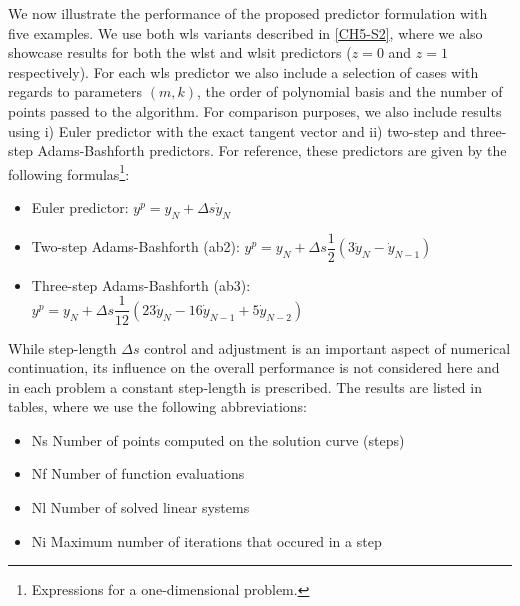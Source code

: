 We now illustrate the performance of the proposed predictor formulation with
five examples. We use both \acrshort{wls} variants described in \ref{CH5-S2}, 
where we also showcase results for both the \acrshort{wlst} and 
\acrshort{wlsit} predictors ($z=0$ and $z=1$ respectively). For each 
\acrshort{wls}
predictor we also include
a selection of cases with regards to parameters $(m,k)$, the order of 
polynomial basis and the number of points passed to the algorithm. For
comparison purposes, we also include results using i) Euler predictor with the
exact tangent vector and ii) two-step and three-step Adams-Bashforth
predictors\cite{Lundberg91}. For reference, these predictors are given by the
following formulas\footnote{Expressions for a one-dimensional problem.}:
\begin{itemize}[noitemsep]
	\item Euler predictor: $y^p = y_N+\Delta s\dot{y}_N$
	\item Two-step Adams-Bashforth (\acrshort{ab2}): $y^p=y_N+\Delta
	s\dfrac{1}{2}(3\dot{y}_N-\dot{y}_{N-1})$
	\item Three-step Adams-Bashforth (\acrshort{ab3}): $y^p=y_N+\Delta
	s\dfrac{1}{12}(23\dot{y}_N-16\dot{y}_{N-1}+5\dot{y}_{N-2})$ 
\end{itemize}
While
step-length $\Delta s$ control and adjustment is an important aspect of 
numerical continuation, its influence on the overall performance is not
considered here and in each problem a constant step-length is prescribed. The
results are listed in tables, where we use the following abbreviations:
\begin{itemize}[noitemsep]
	\item Ns \hspace{0.2cm}  Number of points computed on the solution curve 
	(steps)
	\item Nf  \hspace{0.23cm} Number of function evaluations
	\item Nl  \hspace{0.25cm} Number of solved linear systems
	\item Ni \hspace{0.25cm} Maximum number of iterations that occured in a step
\end{itemize}

